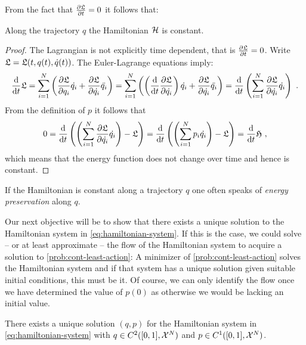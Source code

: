 From the fact that $\frac{\partial \mathfrak{L}}{\partial t} = 0$ it follows that:
\begin{corollary}
	\label{cor:energy-preservation}
	Along the trajectory $q$ the Hamiltonian $\mathcal{H}$ is constant.
\end{corollary}
\begin{proof}
	The Lagrangian is not explicitly time dependent, that is $\frac{\partial \mathfrak{L}}{\partial t} = 0$.
	Write $\mathfrak{L} = \mathfrak{L}(t, q(t), \dot{q}(t))$.
	The Euler-Lagrange equations imply:
	\begin{equation}
		\frac{\mathrm{d}}{\mathrm{d} t} \mathfrak{L} = \sum_{i=1}^{N}\left(\frac{\partial \mathfrak{L}}{\partial q_i} \dot{q_i} + \frac{\partial \mathfrak{L}}{\partial \dot{q_i}} \ddot{q_i} \right )
		=\sum_{i=1}^{N}\left( \left( \frac{\mathrm{d}}{\mathrm{d} t} \frac{\partial \mathfrak{L}}{\partial \dot{q_i}} 
		\right)\dot{q_i}+ \frac{\partial \mathfrak{L}}{\partial \dot{q_i}} \ddot{q_i}\right )
		= \frac{\mathrm{d}}{\mathrm{d} t} \left(\sum_{i=1}^{N} \frac{\partial \mathfrak{L}}{\partial \dot{q_i}} \dot{q_i}\right) \ .
	\end{equation}
	From the definition of $p$ it follows that
	\begin{equation}
		0 = \frac{\mathrm{d}}{\mathrm{d} t} \left( \left(\sum_{i=1}^{N} \frac{\partial \mathfrak{L}}{\partial \dot{q_i}} \dot{q_i} \right) -  \mathfrak{L} \right) 
		= \frac{\mathrm{d}}{\mathrm{d} t} \left( \left(\sum_{i=1}^{N} p_i \dot{q_i} \right ) - \mathfrak{L} \right)
		= \frac{\mathrm{d}}{\mathrm{d} t} \mathfrak{H} \ ,
	\end{equation}
	which means that the energy function does not change over time and hence is constant.
\end{proof}
If the Hamiltonian is constant along a trajectory $q$ one often speaks of \emph{energy preservation} along $q$.

Our next objective will be to show that there exists a unique solution to the Hamiltonian system in \cref{eq:hamiltonian-system}.
If this is the case, we could solve -- or at least approximate -- the flow of the Hamiltonian system to acquire a solution to \cref{prob:cont-least-action}:
A minimizer of \cref{prob:cont-least-action} solves the Hamiltonian system and if that system has a unique solution given suitable initial conditions, this must be it.
Of course, we can only identify the flow once we have determined the value of $p(0)$ as otherwise we would be lacking an initial value.

\begin{theorem}
	\label{theo:hamiltonian-system-solution}
	There exists a unique solution $(q, p)$ for the Hamiltonian system in \cref{eq:hamiltonian-system} with $q \in C^2([0, 1], \mathcal{X}^N)$ and $p \in C^1([0, 1], \mathcal{X}^N)$.
\end{theorem}

